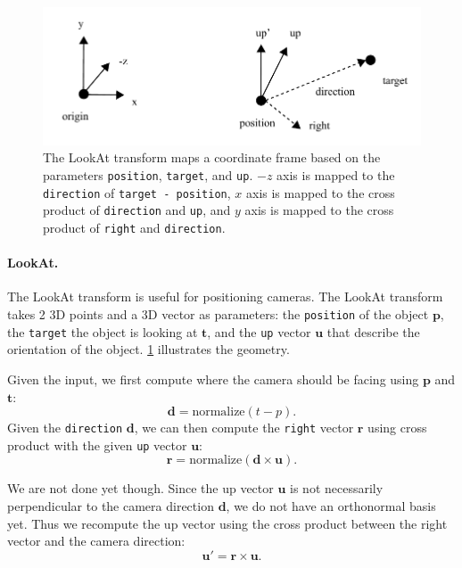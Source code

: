 \begin{figure}[h]
    \centering
    \includegraphics[width=0.7\linewidth]{imgs/lookat.pdf}
    \caption{The LookAt transform maps a coordinate frame based on the parameters \lstinline{position}, \lstinline{target}, and \lstinline{up}. $-z$ axis is mapped to the \lstinline{direction} of \lstinline{target - position}, $x$ axis is mapped to the cross product of \lstinline{direction} and \lstinline{up}, and $y$ axis is mapped to the cross product of \lstinline{right} and \lstinline{direction}.}
    \label{fig:lookat}
\end{figure}


\paragraph{LookAt.} The LookAt transform is useful for positioning cameras. The LookAt transform takes 2 3D points and a 3D vector as parameters: the \lstinline{position} of the object $\mathbf{p}$, the \lstinline{target} the object is looking at $\mathbf{t}$, and the \lstinline{up} vector $\mathbf{u}$ that describe the orientation of the object. \cref{fig:lookat} illustrates the geometry.

Given the input, we first compute where the camera should be facing using $\mathbf{p}$ and $\mathbf{t}$:
\begin{equation}
\mathbf{d} = \text{normalize}(t - p).
\end{equation} 
Given the \lstinline{direction} $\mathbf{d}$, we can then compute the \lstinline{right} vector $\mathbf{r}$ using cross product with the given \lstinline{up} vector $\mathbf{u}$:
\begin{equation}
\mathbf{r} = \text{normalize}\left(\mathbf{d} \times \mathbf{u}\right).
\end{equation}

We are not done yet though. Since the up vector $\mathbf{u}$ is not necessarily perpendicular to the camera direction $\mathbf{d}$, we do not have an orthonormal basis yet. Thus we recompute the up vector using the cross product between the right vector and the camera direction:
\begin{equation}
\mathbf{u}' = \mathbf{r} \times \mathbf{u}.
\end{equation}

